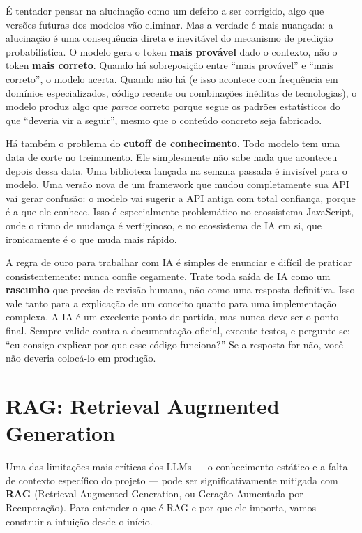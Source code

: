 É tentador pensar na alucinação como um defeito a ser corrigido, algo que versões
futuras dos modelos vão eliminar. Mas a verdade é mais nuançada: a alucinação é uma
consequência direta e inevitável do mecanismo de predição probabilística. O modelo
gera o token \textbf{mais provável} dado o contexto, não o token \textbf{mais
correto}. Quando há sobreposição entre ``mais provável'' e ``mais correto'', o
modelo acerta. Quando não há (e isso acontece com frequência em domínios
especializados, código recente ou combinações inéditas de tecnologias), o modelo
produz algo que \textit{parece} correto porque segue os padrões estatísticos do
que ``deveria vir a seguir'', mesmo que o conteúdo concreto seja fabricado.

Há também o problema do \textbf{cutoff de conhecimento}. Todo modelo tem uma data
de corte no treinamento. Ele simplesmente não sabe nada que aconteceu depois
dessa data. Uma biblioteca lançada na semana passada é invisível para o modelo.
Uma versão nova de um framework que mudou completamente sua API vai gerar confusão:
o modelo vai sugerir a API antiga com total confiança, porque é a que ele conhece.
Isso é especialmente problemático no ecossistema JavaScript, onde o ritmo de
mudança é vertiginoso, e no ecossistema de IA em si, que ironicamente é o que
muda mais rápido.

A regra de ouro para trabalhar com IA é simples de enunciar e difícil de praticar
consistentemente: nunca confie cegamente. Trate toda saída de IA como um
\textbf{rascunho} que precisa de revisão humana, não como uma resposta definitiva.
Isso vale tanto para a explicação de um conceito quanto para uma implementação
complexa. A IA é um excelente ponto de partida, mas nunca deve ser o ponto final.
Sempre valide contra a documentação oficial, execute testes, e pergunte-se: ``eu
consigo explicar por que esse código funciona?'' Se a resposta for não, você não
deveria colocá-lo em produção.

\section{RAG: Retrieval Augmented Generation}

Uma das limitações mais críticas dos LLMs --- o conhecimento estático e a
falta de contexto específico do projeto --- pode ser significativamente
mitigada com \textbf{RAG} (Retrieval Augmented Generation, ou Geração
Aumentada por Recuperação). Para entender o que é RAG e por que ele importa,
vamos construir a intuição desde o início.

